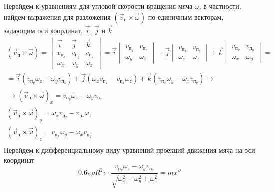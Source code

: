 \documentclass[a5paper, 10pt]{article}
\theoremstyle{definition}
\theoremstyle{plain}
\theoremstyle{remark}
\begin{document}
Перейдем к уравнениям для угловой скорости вращения мяча $ \omega $, в частности, найдем выражения для разложения   $ \left( \vec{v}_{\text{п}} \times \vec{\omega} \right) $ по единичным векторам, задающим оси координат, $ \vec{i}$, $ \vec{j}$ и $ \vec{k}$
\begin{multline}
\left( \vec{v}_{\text{п}} \times \vec{\omega} \right) = 
\begin{vmatrix}
\vec{i} & \vec{j} & \vec{k} \\
v_{\text{п}_{x}} & v_{\text{п}_{y}} & v_{\text{п}_{z}} \\
\omega _{x} & \omega _{y} & \omega _{z}
\end{vmatrix}
= \vec{i} 
\begin{vmatrix}
 v_{\text{п}_{y}} & v_{\text{п}_{z}} \\
\omega _{y} & \omega _{z}
\end{vmatrix}
- \vec{j}
\begin{vmatrix}
 v_{\text{п}_{x}} & v_{\text{п}_{z}} \\
\omega _{x} & \omega _{z}
\end{vmatrix}
+ \vec{k}
\begin{vmatrix}
 v_{\text{п}_{x}} & v_{\text{п}_{y}} \\
\omega _{x} & \omega _{y}
\end{vmatrix}
=\\
= \vec{i}  \left( v_{\text{п}_{y}} \omega _{z} - \omega _{y} v_{\text{п}_{z}} \right) + \vec{j} \left( \omega _{x} v_{\text{п}_{z}} - v_{\text{п}_{x}} \omega _{z} \right) + \vec{k} \left(  v_{\text{п}_{x}} \omega _{y} - \omega _{x} v_{\text{п}_{y}} \right) \to \\
\to \left( \vec{v}_{\text{п}} \times \vec{\omega} \right)_{x} = v_{\text{п}_{y}} \omega _{z} - \omega _{y} v_{\text{п}_{z}}\\
 \left( \vec{v}_{\text{п}} \times \vec{\omega} \right)_{y} = \omega _{x} v_{\text{п}_{z}} - v_{\text{п}_{x}} \omega _{z}\\
 \left( \vec{v}_{\text{п}} \times \vec{\omega} \right)_{z} =  v_{\text{п}_{x}} \omega _{y} - \omega _{x} v_{\text{п}_{y}}\\
\end{multline}
Перейдем к дифференциальному виду уравнений проекций движения мяча на оси координат
\begin{equation}
0.6 \pi \rho  R^{2} v  \cdot  \frac{ v_{\text{п}_{y}} \omega _{z} - \omega _{y} v_{\text{п}_{z}}}{  \sqrt{\omega _{x}^2+\omega _{y}^2+\omega _{z}^2}} = m x''
\end{equation}
\end{document}
